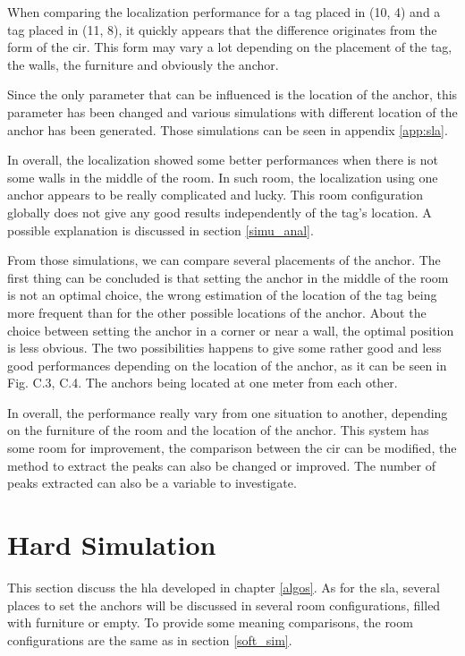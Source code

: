 When comparing the localization performance for a tag placed in (10, 4) and a tag placed in (11, 8), it quickly appears that the difference originates from the form of the \gls{cir}. This form may vary a lot depending on the placement of the tag,  the walls, the furniture and obviously the anchor. 
\vspace{2mm}

Since the only parameter that can be influenced is the location of the anchor, this parameter has been changed and various simulations with different location of the anchor has been generated. Those simulations can be seen in appendix \ref{app:sla}.
\vspace{2mm}

In overall, the localization showed some better performances when there is not some walls in the middle of the room. In such room, the localization using one anchor appears to be really complicated and lucky. This room configuration globally does not give any good results independently of the tag's location. A possible explanation is discussed in section \ref{simu_anal}.
\vspace{2mm}

From those simulations, we can compare several placements of the anchor. The first thing can be concluded is that setting the anchor in the middle of the room is not an optimal choice, the wrong estimation of the location of the tag being more frequent than for the other possible locations of the anchor. About the choice between setting the anchor in a corner or near a wall, the optimal position is less obvious. The two possibilities happens to give some rather good and less good performances depending on the location of the anchor, as it can be seen in Fig. C.3, C.4. The anchors being located at one meter from each other.
\vspace{2mm}

In overall, the performance really vary from one situation to another, depending on the furniture of the room and the location of the anchor. This system has some room for improvement, the comparison between the \gls{cir} can be modified, the method to extract the peaks can also be changed or improved. The number of peaks extracted can also be a variable to investigate.


\section{Hard Simulation}

This section discuss the \gls{hla} developed in chapter \ref{algos}. As for the \gls{sla}, several places to set the anchors will be discussed in several room configurations, filled with furniture or empty. To provide some meaning comparisons, the room configurations are the same as in section \ref{soft_sim}.

